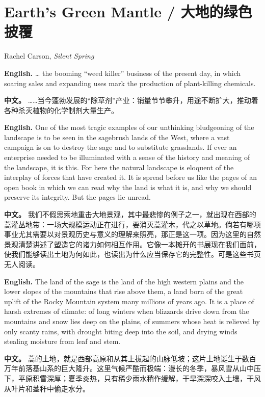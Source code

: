 \section*{Earth's Green Mantle / 大地的绿色披覆}
\begin{flushright}
Rachel Carson, \textit{Silent Spring}
\end{flushright}

\noindent\textbf{English.} \ldots{} the booming ``weed killer'' business of the present day, in which soaring sales and expanding uses mark the production of plant-killing chemicals.
\par
\noindent\textbf{中文。} ……当今蓬勃发展的“除草剂”产业：销量节节攀升，用途不断扩大，推动着各种杀灭植物的化学制剂大量生产。
\par\medskip

\noindent\textbf{English.} One of the most tragic examples of our unthinking bludgeoning of the landscape is to be seen in the sagebrush lands of the West, where a vast campaign is on to destroy the sage and to substitute grasslands. If ever an enterprise needed to be illuminated with a sense of the history and meaning of the landscape, it is this. For here the natural landscape is eloquent of the interplay of forces that have created it. It is spread before us like the pages of an open book in which we can read why the land is what it is, and why we should preserve its integrity. But the pages lie unread.
\par
\noindent\textbf{中文。} 我们不假思索地重击大地景观，其中最悲惨的例子之一，就出现在西部的蒿灌丛地带：一场大规模运动正在进行，要消灭蒿灌木，代之以草地。倘若有哪项事业尤其需要以对景观历史与意义的理解来照亮，那正是这一项。因为这里的自然景观清楚讲述了塑造它的诸力如何相互作用。它像一本摊开的书展现在我们面前，使我们能够读出土地为何如此，也读出为什么应当保存它的完整性。可是这些书页无人阅读。
\par\medskip

\noindent\textbf{English.} The land of the sage is the land of the high western plains and the lower slopes of the mountains that rise above them, a land born of the great uplift of the Rocky Mountain system many millions of years ago. It is a place of harsh extremes of climate: of long winters when blizzards drive down from the mountains and snow lies deep on the plains, of summers whose heat is relieved by only scanty rains, with drought biting deep into the soil, and drying winds stealing moisture from leaf and stem.
\par
\noindent\textbf{中文。} 蒿的土地，就是西部高原和从其上拔起的山脉低坡；这片土地诞生于数百万年前落基山系的巨大隆升。这里气候严酷而极端：漫长的冬季，暴风雪从山中压下，平原积雪深厚；夏季炎热，只有稀少雨水稍作缓解，干旱深深咬入土壤，干风从叶片和茎秆中偷走水分。
\par\medskip

